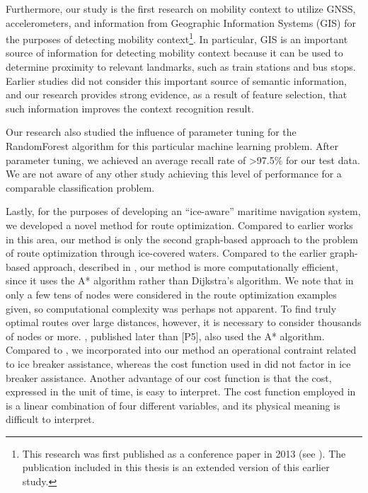 Furthermore, our study is the first research on mobility context to utilize GNSS, accelerometers, and information from Geographic Information Systems (GIS) for the purposes of detecting mobility context\footnote{This research was first published as a conference paper in 2013 (see \cite{Guinness2013}). The publication included in this thesis is an extended version of this earlier study.}. In particular, GIS is an important source of information for detecting mobility context because it can be used to determine proximity to relevant landmarks, such as train stations and bus stops. Earlier studies did not consider this important source of semantic information, and our research provides strong evidence, as a result of feature selection, that such information improves the context recognition result.

Our research also studied the influence of parameter tuning for the RandomForest algorithm for this particular machine learning problem. After parameter tuning, we achieved an average recall rate of \textgreater97.5\% for our test data. We are not aware of any other study achieving this level of performance for a comparable classification problem.

Lastly, for the purposes of developing an ``ice-aware'' maritime navigation system, we developed a novel method for route optimization. Compared to earlier works in this area, our method is only the second graph-based approach to the problem of route optimization through ice-covered waters. Compared to the earlier graph-based approach, described in \cite{nam2013simulation}, our method is more computationally efficient, since it uses the A* algorithm rather than Dijkstra's algorithm. We note that in \cite{nam2013simulation} only a few tens of nodes were considered in the route optimization examples given, so computational complexity was perhaps not apparent. To find truly optimal routes over large distances, however, it is necessary to consider thousands of nodes or more. \cite{choi2015arctic}, published later than [P5], also used the A* algorithm. Compared to \cite{choi2015arctic}, we incorporated into our method an operational contraint related to ice breaker assistance, whereas the cost function used in \cite{choi2015arctic} did not factor in ice breaker assistance. Another advantage of our cost function is that the cost, expressed in the unit of time, is easy to interpret. The cost function employed in \cite{choi2015arctic} is a linear combination of four different variables, and its physical meaning is difficult to interpret.

